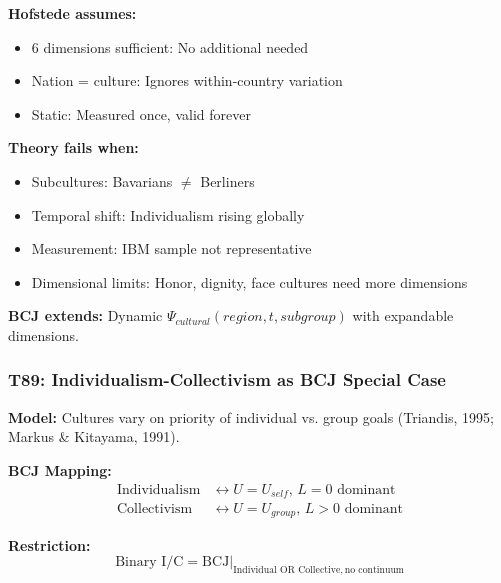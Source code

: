 \begin{tcolorbox}[colback=red!5!white, colframe=red!75!black,
    title=Boundary Condition: Where Hofstede Fails]
\textbf{Hofstede assumes:}
\begin{itemize}[nosep]
\item 6 dimensions sufficient: No additional needed
\item Nation = culture: Ignores within-country variation
\item Static: Measured once, valid forever
\end{itemize}

\textbf{Theory fails when:}
\begin{itemize}[nosep]
\item Subcultures: Bavarians $\neq$ Berliners
\item Temporal shift: Individualism rising globally
\item Measurement: IBM sample not representative
\item Dimensional limits: Honor, dignity, face cultures need more dimensions
\end{itemize}

\textbf{BCJ extends:} Dynamic $\Psi_{cultural}(region, t, subgroup)$ with expandable dimensions.
\end{tcolorbox}

\subsubsection*{T89: Individualism-Collectivism as BCJ Special Case}

\textbf{Model:} Cultures vary on priority of individual vs. group goals (Triandis, 1995; Markus \& Kitayama, 1991).

\textbf{BCJ Mapping:}
\begin{align}
\text{Individualism} &\leftrightarrow U = U_{self}, \, L = 0 \text{ dominant} \\
\text{Collectivism} &\leftrightarrow U = U_{group}, \, L > 0 \text{ dominant}
\end{align}

\textbf{Restriction:}
\begin{equation}
\text{Binary I/C} = \text{BCJ} \big|_{\text{Individual OR Collective}, \, \text{no continuum}}
\end{equation}

